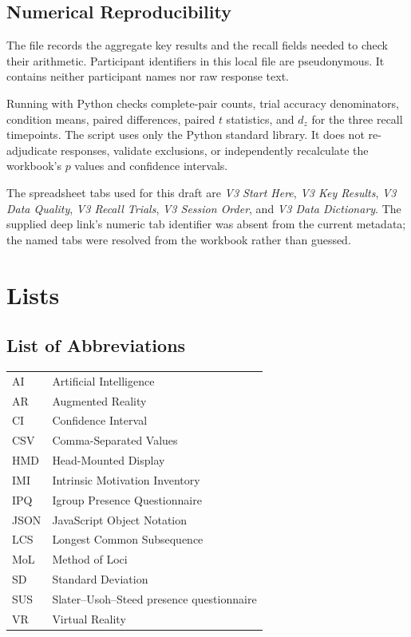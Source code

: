 \section{Numerical Reproducibility}
The file  records the aggregate key results and the recall fields needed to check their arithmetic. Participant identifiers in this local file are pseudonymous. It contains neither participant names nor raw response text.

Running  with Python checks complete-pair counts, trial accuracy denominators, condition means, paired differences, paired $t$ statistics, and $d_z$ for the three recall timepoints. The script uses only the Python standard library. It does not re-adjudicate responses, validate exclusions, or independently recalculate the workbook's $p$ values and confidence intervals.

The spreadsheet tabs used for this draft are \emph{V3 Start Here}, \emph{V3 Key Results}, \emph{V3 Data Quality}, \emph{V3 Recall Trials}, \emph{V3 Session Order}, and \emph{V3 Data Dictionary}. The supplied deep link's numeric tab identifier was absent from the current metadata; the named tabs were resolved from the workbook rather than guessed.

\chapter{Lists}
\section*{List of Abbreviations}
\begin{tabular}{ll}
AI & Artificial Intelligence \\
AR & Augmented Reality \\
CI & Confidence Interval \\
CSV & Comma-Separated Values \\
HMD & Head-Mounted Display \\
IMI & Intrinsic Motivation Inventory \\
IPQ & Igroup Presence Questionnaire \\
JSON & JavaScript Object Notation \\
LCS & Longest Common Subsequence \\
MoL & Method of Loci \\
SD & Standard Deviation \\
SUS & Slater--Usoh--Steed presence questionnaire \\
VR & Virtual Reality \\
\end{tabular}
\clearpage
\listoffigures
{}
\clearpage
\listoftables
{}

